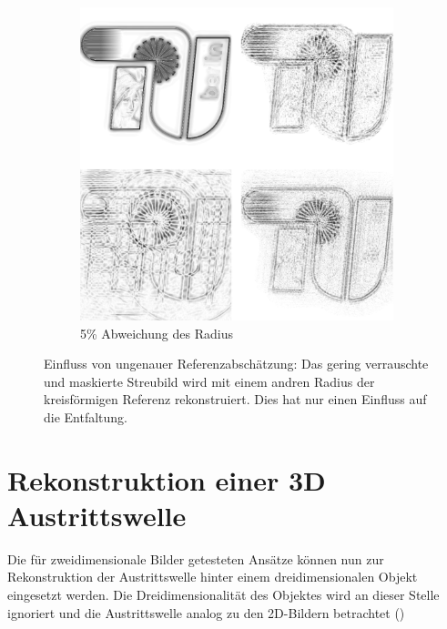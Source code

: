 \begin{figure}
\begin{subfigure}[b]{0.45\textwidth}
		\includegraphics[width=\textwidth]{images/recon2d-mask16bit16error05.png}
		\caption{5\% Abweichung des Radius}	
	\end{subfigure}
	\caption[2D Rekonstruktion: Referenz]{Einfluss von ungenauer Referenzabschätzung: Das gering verrauschte und maskierte Streubild wird mit einem andren Radius der kreisförmigen Referenz rekonstruiert. Dies hat nur einen Einfluss auf die Entfaltung.}
	\label{fig:recon2d-ref}
\end{figure}
\section{Rekonstruktion einer 3D Austrittswelle}
Die für zweidimensionale Bilder getesteten Ansätze können nun zur Rekonstruktion der Austrittswelle hinter einem dreidimensionalen Objekt eingesetzt werden. Die Dreidimensionalität des Objektes wird an dieser Stelle ignoriert und die Austrittswelle analog zu den 2D-Bildern betrachtet ()

